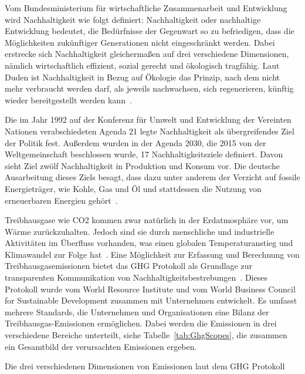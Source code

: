 Vom Bundesministerium für wirtschaftliche Zusammenarbeit und Entwicklung~\cite{BundesministeriumWirtschaftlicheZusammenarbeitundEntwicklung} wird Nachhaltigkeit wie folgt definiert:
\glqq Nachhaltigkeit oder nachhaltige Entwicklung bedeutet, die Bedürfnisse der Gegenwart so zu befriedigen, dass die Möglichkeiten zukünftiger Generationen nicht eingeschränkt werden.\grqq{}
Dabei erstrecke sich Nachhaltigkeit gleichermaßen auf drei verschiedene Dimensionen, nämlich wirtschaftlich effizient, sozial gerecht und ökologisch tragfähig.
Laut Duden ist Nachhaltigkeit in Bezug auf Ökologie das \glqq Prinzip, nach dem nicht mehr verbraucht werden darf, als jeweils nachwachsen, sich regenerieren, künftig wieder bereitgestellt werden kann\grqq{}~\cite{Dudenredaktion.27.04.2018}.

Die im Jahr 1992 auf der Konferenz für Umwelt und Entwicklung der Vereinten Nationen verabschiedeten Agenda 21 legte Nachhaltigkeit als übergreifendes Ziel der Politik fest.
Außerdem wurden in der Agenda 2030, die 2015 von der Weltgemeinschaft beschlossen wurde, 17 Nachhaltigkeitsziele definiert.
Davon sieht Ziel zwölf Nachhaltigkeit in Produktion und Konsum vor.
Die deutsche Ausarbeitung dieses Ziels besagt, dass dazu unter anderem der Verzicht auf fossile Energieträger, wie Kohle, Gas und Öl und stattdessen die Nutzung von erneuerbaren Energien gehört~\cite{Bundesregierunginformiert}.

Treibhausgase wie \ac{CO2} kommen zwar natürlich in der Erdatmosphäre vor, um Wärme zurückzuhalten.
Jedoch sind sie durch menschliche und industrielle Aktivitäten im Überfluss vorhanden, was einen globalen Temperaturanstieg und Klimawandel zur Folge hat~\cite{Currie.2024}.
Eine Möglichkeit zur Erfassung und Berechnung von Treibhausgasemissionen bietet das \ac{GHG} Protokoll als Grundlage zur transparenten Kommunikation von Nachhaltigkeitsbestrebungen~\cite{WorldBusinessCouncilforSustainableDevelopment.2004}.
Dieses Protokoll wurde vom World Resource Institute und vom World Business Council for Sustainable Development zusammen mit Unternehmen entwickelt.
Es umfasst mehrere Standards, die Unternehmen und Organisationen eine Bilanz der Treibhausgas-Emissionen ermöglichen.
Dabei werden die Emissionen in drei verschiedene Bereiche unterteilt, siehe Tabelle~\ref{tab:GhgScopes}, die zusammen ein Gesamtbild der verursachten Emissionen ergeben.
\begin{table}[t]
 \centering\small
 \caption[GHG Protokoll Scopes]{Die drei verschiedenen Dimensionen von Emissionen laut dem GHG Protokoll~\cite{WorldBusinessCouncilforSustainableDevelopment.2004}}
 \label{tab:GhgScopes}
 
\end{table}

